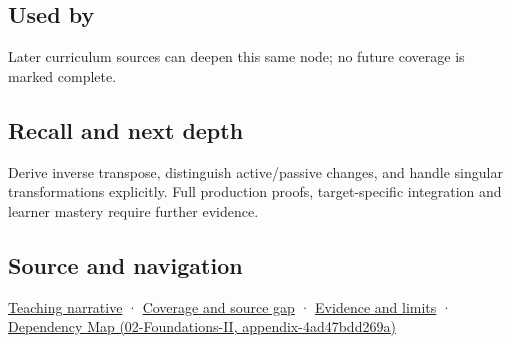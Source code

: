 \subsection{Used by}\label{used-by}

Later curriculum sources can deepen this same node; no future coverage is marked complete.

\subsection{Recall and next depth}\label{recall-and-next-depth}

Derive inverse transpose, distinguish active/passive changes, and handle singular transformations explicitly. Full production proofs, target-specific integration and learner mastery require further evidence.

\subsection{Source and navigation}\label{source-and-navigation}

\href{Continuous\%20Notes/Computing\%20Foundations\%20-\%20From\%20Bits\%20to\%20C++\%20and\%20Systems\%20APIs\#A\%20normal\%20is\%20a\%20measuring\%20rule\%20before\%20it\%20is\%20an\%20arrow}{Teaching narrative} · \hyperref[appendix-fd090d982a15]{Coverage and source gap} · \hyperref[appendix-a103e7846d21]{Evidence and limits} · \href{}{Dependency Map (02-Foundations-II, appendix-4ad47bdd269a)}
